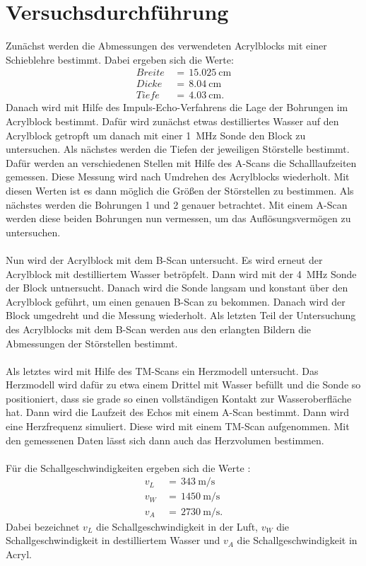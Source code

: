 \documentclass[
  bibliography=totoc,     %
  captions=tableheading,  %
  titlepage=firstiscover, %
]{scrartcl}
\begin{document}
\section{Versuchsdurchführung}
\label{sec:versuchsdurchführung}
Zunächst werden die Abmessungen des verwendeten Acrylblocks mit einer
Schieblehre
bestimmt. Dabei ergeben sich die Werte:
\begin{align*}
  Breite\,&=\,\SI{15.025}{\centi\meter} \\
  Dicke\,&=\,\SI{8.04}{\centi\meter} \\
  Tiefe\,&=\,\SI{4.03}{\centi\meter}.
\end{align*}
Danach wird mit Hilfe des Impuls-Echo-Verfahrens die Lage der Bohrungen im
Acrylblock bestimmt. Dafür wird zunächst etwas destilliertes Wasser auf den
Acrylblock getropft um danach mit einer \SI{1}{\mega\hertz} Sonde den Block zu
untersuchen.
Als nächstes werden die Tiefen der jeweiligen Störstelle bestimmt. Dafür
werden an verschiedenen Stellen mit Hilfe des A-Scans die Schalllaufzeiten
gemessen. Diese Messung wird nach Umdrehen des Acrylblocks wiederholt. Mit
diesen Werten ist es dann möglich die Größen der Störstellen zu bestimmen.
Als nächstes werden die Bohrungen 1 und 2 genauer betrachtet. Mit einem A-Scan
werden diese beiden Bohrungen nun vermessen, um das Auflösungsvermögen zu
untersuchen.\\
\\
Nun wird der Acrylblock mit dem B-Scan untersucht. Es wird erneut der
Acrylblock mit destilliertem Wasser betröpfelt. Dann wird mit der
\SI{4}{\mega\hertz} Sonde der Block untnersucht. Danach wird die Sonde langsam
und konstant über den Acrylblock geführt, um einen genauen B-Scan zu bekommen.
Danach wird der Block umgedreht und die Messung wiederholt. Als letzten Teil
der Untersuchung des Acrylblocks mit dem B-Scan werden aus den erlangten
Bildern die Abmessungen der Störstellen bestimmt. \\
\\
Als letztes wird mit Hilfe des TM-Scans ein Herzmodell untersucht. Das
Herzmodell wird dafür zu etwa einem Drittel mit Wasser befüllt und die Sonde so
positioniert, dass sie grade so einen vollständigen Kontakt zur
Wasseroberfläche hat.
Dann wird die Laufzeit des Echos mit einem A-Scan bestimmt. Dann wird eine
Herzfrequenz simuliert. Diese wird mit einem TM-Scan
aufgenommen. Mit den gemessenen Daten lässt sich dann auch das Herzvolumen
bestimmen.\\
\\
Für die Schallgeschwindigkeiten ergeben sich die Werte \cite{olympus} \cite{spektrum}:
\begin{align*}
  v_L\,&=\,\SI{343}{\meter\per\second} \\
  v_W\,&=\,\SI{1450}{\meter\per\second} \\
  v_A\,&=\,\SI{2730}{\meter\per\second}.
\end{align*}
Dabei bezeichnet $v_L$ die Schallgeschwindigkeit in der Luft, $v_W$ die
Schallgeschwindigkeit in destilliertem Wasser und $v_A$ die
Schallgeschwindigkeit in Acryl.
\end{document}
